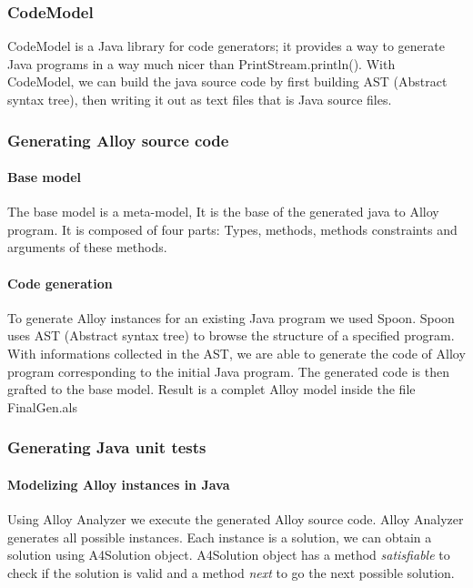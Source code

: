 \subsubsection{CodeModel}
CodeModel is a Java library for code generators; it provides a way to generate Java programs in a way much nicer than PrintStream.println().
With CodeModel, we can build the java source code by first building AST (Abstract syntax tree)\cite{ast}, then writing it out as text files that is Java source files.\cite{codeModel}


\subsubsection{Generating Alloy source code}
\paragraph{Base model}
The base model is a meta-model, It is the base of the generated java to Alloy program.
It is composed of four parts: Types, methods, methods constraints and arguments of these methods.


\paragraph{Code generation}
To generate Alloy instances for an existing Java program we used Spoon. Spoon uses AST (Abstract syntax tree)\cite{ast} to browse the structure of a specified program. With informations collected in the AST, we are able to generate the code of Alloy program corresponding to the initial Java program. The generated code is then grafted to the base model.
Result is a complet Alloy model inside the file FinalGen.als

\subsubsection{Generating Java unit tests}
\paragraph{Modelizing Alloy instances in Java}
Using Alloy Analyzer we execute the generated Alloy source code. Alloy Analyzer generates all possible instances.
Each instance is a solution, we can obtain a solution using A4Solution object. A4Solution object has a method \textit{satisfiable} to check if the solution is valid and a method \textit{next} to go the next possible solution.

